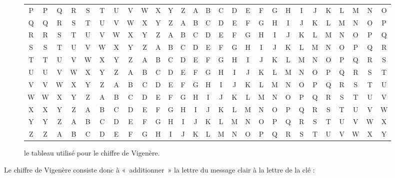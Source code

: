 \begin{figure}[h]
\begin{center}
\begin{tabular}{c|c@{}c@{}c@{}c@{}c@{}c@{}c@{}c@{}c@{}c@{}c@{}c@{}c@{}c@{}c@{}c@{}c@{}c@{}c@{}c@{}c@{}c@{}c@{}c@{}c@{}c}
      P & P & Q & R & S & T & U & V & W & X & Y & Z & A & B & C & D & E & F & G & H & I & J & K & L & M & N & O \\
      Q & Q & R & S & T & U & V & W & X & Y & Z & A & B & C & D & E & F & G & H & I & J & K & L & M & N & O & P \\
      R & R & S & T & U & V & W & X & Y & Z & A & B & C & D & E & F & G & H & I & J & K & L & M & N & O & P & Q \\
      S & S & T & U & V & W & X & Y & Z & A & B & C & D & E & F & G & H & I & J & K & L & M & N & O & P & Q & R \\
      T & T & U & V & W & X & Y & Z & A & B & C & D & E & F & G & H & I & J & K & L & M & N & O & P & Q & R & S \\
      U & U & V & W & X & Y & Z & A & B & C & D & E & F & G & H & I & J & K & L & M & N & O & P & Q & R & S & T \\
      V & V & W & X & Y & Z & A & B & C & D & E & F & G & H & I & J & K & L & M & N & O & P & Q & R & S & T & U \\
      W & W & X & Y & Z & A & B & C & D & E & F & G & H & I & J & K & L & M & N & O & P & Q & R & S & T & U & V \\
      X & X & Y & Z & A & B & C & D & E & F & G & H & I & J & K & L & M & N & O & P & Q & R & S & T & U & V & W \\
      Y & Y & Z & A & B & C & D & E & F & G & H & I & J & K & L & M & N & O & P & Q & R & S & T & U & V & W & X \\
      Z & Z & A & B & C & D & E & F & G & H & I & J & K & L & M & N & O & P & Q & R & S & T & U & V & W & X & Y \\
    \end{tabular}
  \end{center}
  \caption{le tableau utilisé pour le chiffre de Vigenère.}
  \label{fig:VigenereTableau}
\end{figure}

Le chiffre de Vigenère consiste donc à «~additionner~» la lettre du
message clair à la lettre de la clé : 


